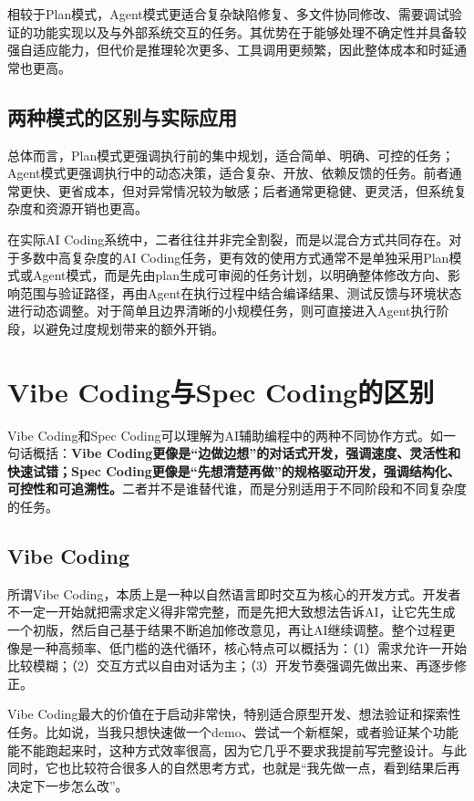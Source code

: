 \documentclass[UTF8]{ctexart}
\begin{document}
相较于Plan模式，Agent模式更适合复杂缺陷修复、多文件协同修改、需要调试验证的功能实现以及与外部系统交互的任务。其优势在于能够处理不确定性并具备较强自适应能力，但代价是推理轮次更多、工具调用更频繁，因此整体成本和时延通常也更高。

\subsection{两种模式的区别与实际应用}

总体而言，Plan模式更强调执行前的集中规划，适合简单、明确、可控的任务；Agent模式更强调执行中的动态决策，适合复杂、开放、依赖反馈的任务。前者通常更快、更省成本，但对异常情况较为敏感；后者通常更稳健、更灵活，但系统复杂度和资源开销也更高。

在实际AI Coding系统中，二者往往并非完全割裂，而是以混合方式共同存在。对于多数中高复杂度的AI Coding任务，更有效的使用方式通常不是单独采用Plan模式或Agent模式，而是先由plan生成可审阅的任务计划，以明确整体修改方向、影响范围与验证路径，再由Agent在执行过程中结合编译结果、测试反馈与环境状态进行动态调整。对于简单且边界清晰的小规模任务，则可直接进入Agent执行阶段，以避免过度规划带来的额外开销。

\section{Vibe Coding与Spec Coding的区别}

Vibe Coding和Spec Coding可以理解为AI辅助编程中的两种不同协作方式。如一句话概括：\textbf{Vibe Coding更像是“边做边想”的对话式开发，强调速度、灵活性和快速试错；Spec Coding更像是“先想清楚再做”的规格驱动开发，强调结构化、可控性和可追溯性。}二者并不是谁替代谁，而是分别适用于不同阶段和不同复杂度的任务。

\subsection{Vibe Coding}

所谓Vibe Coding，本质上是一种以自然语言即时交互为核心的开发方式。开发者不一定一开始就把需求定义得非常完整，而是先把大致想法告诉AI，让它先生成一个初版，然后自己基于结果不断追加修改意见，再让AI继续调整。整个过程更像是一种高频率、低门槛的迭代循环，核心特点可以概括为：（1）需求允许一开始比较模糊；（2）交互方式以自由对话为主；（3）开发节奏强调先做出来、再逐步修正。

Vibe Coding最大的价值在于启动非常快，特别适合原型开发、想法验证和探索性任务。比如说，当我只想快速做一个demo、尝试一个新框架，或者验证某个功能能不能跑起来时，这种方式效率很高，因为它几乎不要求我提前写完整设计。与此同时，它也比较符合很多人的自然思考方式，也就是“我先做一点，看到结果后再决定下一步怎么改”。
\end{document}
